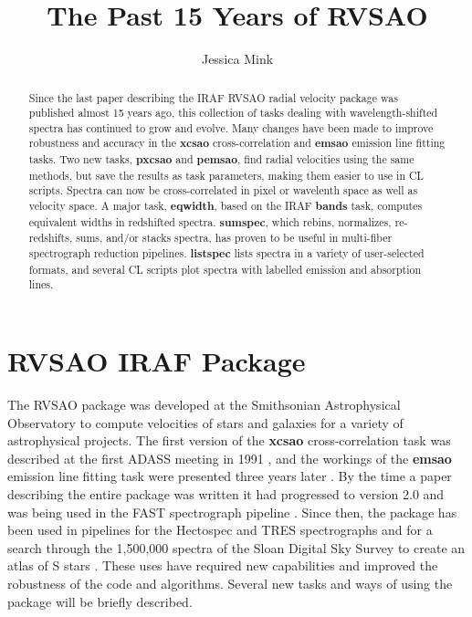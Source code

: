 
\resetcounters




\title{The Past 15 Years of RVSAO}
\author{Jessica Mink}


\begin{abstract}
Since the last paper describing the IRAF RVSAO radial velocity package
was published almost 15 years ago, this collection of tasks dealing
with wavelength-shifted spectra has continued to grow and evolve.
Many changes have been made to improve robustness and accuracy
in the \textbf{xcsao} cross-correlation and \textbf{emsao} emission line fitting tasks.
Two new tasks, \textbf{pxcsao} and \textbf{pemsao}, find radial velocities using the same
methods, but save the results as task parameters, making them easier to
use in CL scripts.  Spectra can now be cross-correlated in pixel or
wavelenth space as well as velocity space.  A major task, \textbf{eqwidth}, based
on the IRAF \textbf{bands} task, computes equivalent widths in redshifted spectra.
\textbf{sumspec}, which rebins, normalizes, re-redshifts, sums, and/or stacks
spectra, has proven to be useful in multi-fiber spectrograph reduction
pipelines.  \textbf{listspec} lists spectra in a variety of user-selected formats,
and several CL scripts plot spectra with labelled emission and absorption
lines. 

\end{abstract}

\section*{RVSAO IRAF Package}

The RVSAO package was developed at the Smithsonian Astrophysical
Observatory to compute velocities of stars and galaxies for a variety
of astrophysical projects.  The first version of the \textbf{xcsao}
cross-correlation task was described at the first ADASS meeting in 1991
\citep{xcsao_1991},
and the workings of the \textbf{emsao} emission line fitting task were
presented three years later
\citep{1995ASPC...77..496M}.
By the time a paper describing the entire package was written
\citep{1998PASP..110..934K}
it had progressed to version 2.0 and was being used in the FAST
spectrograph pipeline
\citep{1997ASPC..125..140T}.  Since then, the package has been used in
pipelines for the Hectospec
\citep{2007ASPC..376..249M}
and TRES
\citep{2011ASPC..442..305M}
spectrographs and for a search through the 1,500,000 spectra of the
Sloan Digital Sky Survey to create an atlas of S stars
\citep{2011AAS...21715303O}.  These uses have required new capabilities
and improved the robustness of the code and algorithms.  Several new
tasks and ways of using the package will be briefly described.

